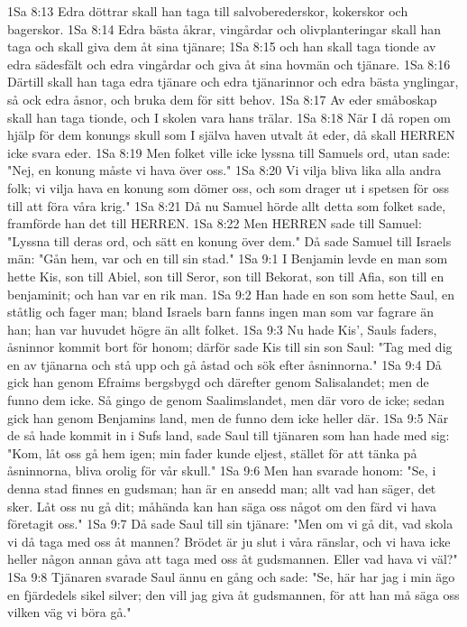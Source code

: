 1Sa 8:13  Edra döttrar skall han taga till salvoberederskor, kokerskor och bagerskor.
1Sa 8:14  Edra bästa åkrar, vingårdar och olivplanteringar skall han taga och skall giva dem åt sina tjänare;
1Sa 8:15  och han skall taga tionde av edra sädesfält och edra vingårdar och giva åt sina hovmän och tjänare.
1Sa 8:16  Därtill skall han taga edra tjänare och edra tjänarinnor och edra bästa ynglingar, så ock edra åsnor, och bruka dem för sitt behov.
1Sa 8:17  Av eder småboskap skall han taga tionde, och I skolen vara hans trälar.
1Sa 8:18  När I då ropen om hjälp för dem konungs skull som I själva haven utvalt åt eder, då skall HERREN icke svara eder.
1Sa 8:19  Men folket ville icke lyssna till Samuels ord, utan sade: "Nej, en konung måste vi hava över oss."
1Sa 8:20  Vi vilja bliva lika alla andra folk; vi vilja hava en konung som dömer oss, och som drager ut i spetsen för oss till att föra våra krig."
1Sa 8:21  Då nu Samuel hörde allt detta som folket sade, framförde han det till HERREN.
1Sa 8:22  Men HERREN sade till Samuel: "Lyssna till deras ord, och sätt en konung över dem." Då sade Samuel till Israels män: "Gån hem, var och en till sin stad."
1Sa 9:1  I Benjamin levde en man som hette Kis, son till Abiel, son till Seror, son till Bekorat, son till Afia, son till en benjaminit; och han var en rik man.
1Sa 9:2  Han hade en son som hette Saul, en ståtlig och fager man; bland Israels barn fanns ingen man som var fagrare än han; han var huvudet högre än allt folket.
1Sa 9:3  Nu hade Kis', Sauls faders, åsninnor kommit bort för honom; därför sade Kis till sin son Saul: "Tag med dig en av tjänarna och stå upp och gå åstad och sök efter åsninnorna."
1Sa 9:4  Då gick han genom Efraims bergsbygd och därefter genom Salisalandet; men de funno dem icke. Så gingo de genom Saalimslandet, men där voro de icke; sedan gick han genom Benjamins land, men de funno dem icke heller där.
1Sa 9:5  När de så hade kommit in i Sufs land, sade Saul till tjänaren som han hade med sig: "Kom, låt oss gå hem igen; min fader kunde eljest, stället för att tänka på åsninnorna, bliva orolig för vår skull."
1Sa 9:6  Men han svarade honom: "Se, i denna stad finnes en gudsman; han är en ansedd man; allt vad han säger, det sker. Låt oss nu gå dit; måhända kan han säga oss något om den färd vi hava företagit oss."
1Sa 9:7  Då sade Saul till sin tjänare: "Men om vi gå dit, vad skola vi då taga med oss åt mannen? Brödet är ju slut i våra ränslar, och vi hava icke heller någon annan gåva att taga med oss åt gudsmannen. Eller vad hava vi väl?"
1Sa 9:8  Tjänaren svarade Saul ännu en gång och sade: "Se, här har jag i min ägo en fjärdedels sikel silver; den vill jag giva åt gudsmannen, för att han må säga oss vilken väg vi böra gå."
